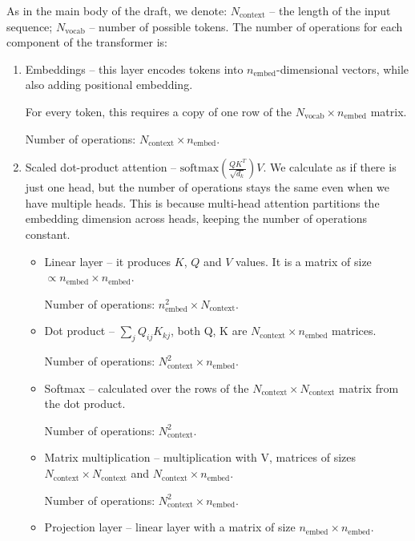 \documentclass[3p, times,merge]{elsarticle}
\begin{document}
As in the main body of the draft, we denote: $N_{\text{context}}$ -- the length of the input sequence;
%
$N_\text{vocab}$ -- number of possible tokens.
The number of operations for each component of the transformer is:
\begin{enumerate}
    \item Embeddings -- this layer encodes tokens into $n_\text{embed}$-dimensional vectors, while also adding positional embedding.

    For every token, this requires a copy of one row of the $N_\text{vocab} \times n_\text{embed}$ matrix.

    Number of operations: $N_{\text{context}} \times n_{\text{embed}}$.

    \item Scaled dot-product attention -- $\text{softmax}\left(\frac{QK^T}{\sqrt{d_k}}\right)V$. We calculate as if there is just one head, but the number of operations stays the same even when we have multiple heads. This is because multi-head attention partitions the embedding dimension across heads, keeping the number of operations constant.
    \begin{itemize}
        \item Linear layer --
            it produces $K$, $Q$ and $V$ values. It is a matrix of size $\propto n_{\text{embed}} \times n_{\text{embed}}$.
            
        Number of operations: $n_{\text{embed}}^2 \times N_{\text{context}}$.

        \item Dot product -- $\sum_j Q_{ij} K_{kj}$, both Q, K are $N_{\text{context}} \times n_{\text{embed}}$ matrices.

        Number of operations:
        $N_{\text{context}}^2 \times n_{\text{embed}}$.
        \item Softmax -- calculated over the rows of the $N_{\text{context}} \times N_{\text{context}}$ matrix from the dot product.

    Number of operations: $N_{\text{context}}^2$.

    \item Matrix multiplication -- multiplication with V, matrices of sizes $N_{\text{context}} \times N_{\text{context}}$ and $N_{\text{context}} \times n_{\text{embed}}$.
    
    Number of operations:  $N_{\text{context}}^2\times n_{\text{embed}}$.

    \item Projection layer -- linear layer with a matrix of size $n_\text{embed} \times n_\text{embed}$.
    

\end{itemize}
\end{enumerate}
\end{document}
